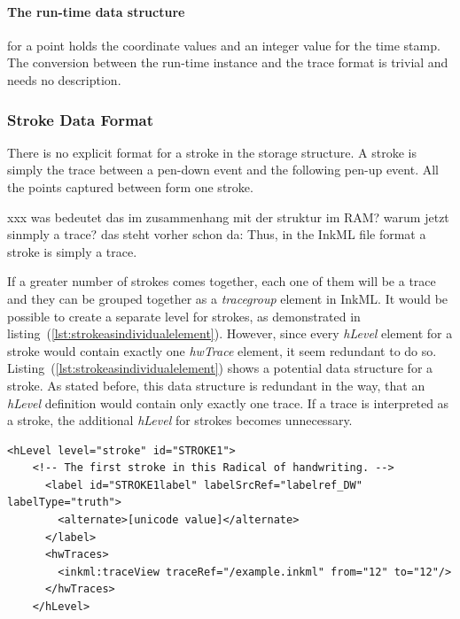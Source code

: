 \paragraph{The run-time data structure} for a point holds the coordinate values 
and an integer value for the time stamp. The conversion between the run-time 
instance and the trace format is trivial and needs no description.

\subsubsection{Stroke Data Format}
\label{sec:hwre:strokedataformat}

There is no explicit format for a stroke in the storage structure.
A stroke is simply the trace between a pen-down event and the following pen-up
event. All the points captured between form one stroke.

xxx was bedeutet das im zusammenhang mit der struktur im RAM?
warum jetzt sinmply a trace? das steht vorher schon da:
Thus, in the InkML file format a stroke is simply a trace.


If a greater number of strokes comes together, each one of them will be a trace
and they can be grouped together as a \emph{tracegroup} element in InkML.
It would be possible to create a separate level for strokes, as demonstrated
in listing~(\ref{lst:strokeasindividualelement}). However, since every 
\emph{hLevel} element for a stroke would contain exactly one \emph{hwTrace} 
element, it seem redundant to do so.
Listing~(\ref{lst:strokeasindividualelement}) shows a potential data structure
for a stroke. As stated before, this data structure is redundant in the way, 
that an \emph{hLevel} definition would contain only exactly one trace.
If a trace is interpreted as a stroke, the additional \emph{hLevel} for strokes
becomes unnecessary.

\begin{xmlcode}
  \begin{lstlisting}[emph={hLevel,hwTraces,label,alternative},
                     emphstyle=\color{blue}\textbf,
                     emph={[2]level,labelSrcRef,labelType,traceRef,from,to},
                     emphstyle={[2]\color{red}},
                     caption={An example of how a stroke could be 
                              represented in UPX},
                     label=lst:strokeasindividualelement]
    <hLevel level="stroke" id="STROKE1">
    <!-- The first stroke in this Radical of handwriting. -->
      <label id="STROKE1label" labelSrcRef="labelref_DW" labelType="truth">
        <alternate>[unicode value]</alternate>
      </label>
      <hwTraces>
        <inkml:traceView traceRef="/example.inkml" from="12" to="12"/>
      </hwTraces>
    </hLevel>
  \end{lstlisting}
\end{xmlcode}

